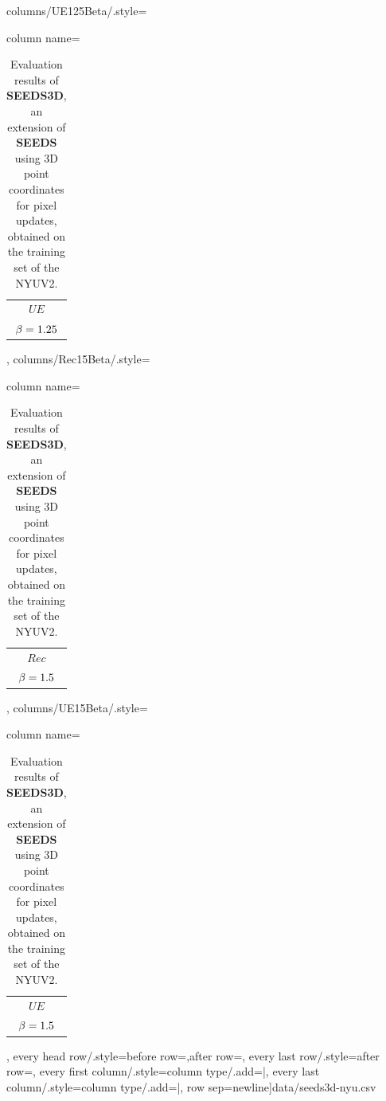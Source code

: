 \begin{table}[H]
		columns/UE125Beta/.style={column name=\begin{tabular}{c}$UE$\\$\beta= 1.25$\end{tabular}},%
		columns/Rec15Beta/.style={column name=\begin{tabular}{c}$Rec$\\$\beta= 1.5$\end{tabular}},%
		columns/UE15Beta/.style={column name=\begin{tabular}{c}$UE$\\$\beta= 1.5$\end{tabular}},%
		every head row/.style={before row=\hline,after row=\hline\hline},%
		every last row/.style={after row=\hline},%
		every first column/.style={column type/.add={|}{}},%
		every last column/.style={column type/.add={}{|}},%
		row sep=newline]{data/seeds3d-nyu.csv}
	\caption[Evaluation results of \textbf{SEEDS3D}, an extension of \textbf{SEEDS} \cite{VanDenBerghBoixRoigVanGool:2013} using 3D point coordinates for pixel updates, obtained on the training set of the NYU Depth Dataset \cite{SilbermanHoiemKohliFergus:2012}.]{Evaluation results of \textbf{SEEDS3D}, an extension of \textbf{SEEDS} \cite{VanDenBerghBoixRoigVanGool:2013} using 3D point coordinates for pixel updates, obtained on the training set of the NYUV2.}
\end{table}
